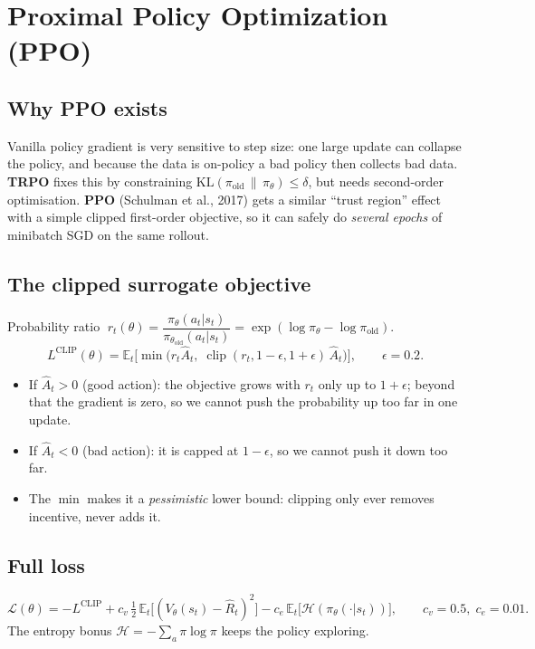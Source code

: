 \documentclass[11pt,a4paper]{article}
\newcommand{\E}{\mathbb{E}}
\begin{document}
\section{Proximal Policy Optimization (PPO)}

\subsection{Why PPO exists}
Vanilla policy gradient is very sensitive to step size: one large update can collapse the policy,
and because the data is on-policy a bad policy then collects bad data. \textbf{TRPO} fixes this by
constraining $\mathrm{KL}(\pi_{\text{old}}\,\|\,\pi_\theta)\le\delta$, but needs second-order
optimisation. \textbf{PPO} (Schulman et al., 2017) gets a similar ``trust region'' effect with a
simple clipped first-order objective, so it can safely do \emph{several epochs} of minibatch SGD on
the same rollout.

\subsection{The clipped surrogate objective}
Probability ratio $\;r_t(\theta)=\dfrac{\pi_\theta(a_t|s_t)}{\pi_{\theta_\text{old}}(a_t|s_t)}=\exp(\log\pi_\theta-\log\pi_{\text{old}})$.
\[
L^{\text{CLIP}}(\theta)=\E_t\Big[\min\big(r_t\hat A_t,\;\operatorname{clip}(r_t,1-\epsilon,1+\epsilon)\,\hat A_t\big)\Big],\qquad \epsilon=0.2.
\]
\begin{itemize}
  \item If $\hat A_t>0$ (good action): the objective grows with $r_t$ only up to $1+\epsilon$; beyond that
        the gradient is zero, so we cannot push the probability up too far in one update.
  \item If $\hat A_t<0$ (bad action): it is capped at $1-\epsilon$, so we cannot push it down too far.
  \item The $\min$ makes it a \emph{pessimistic} lower bound: clipping only ever removes incentive,
        never adds it.
\end{itemize}

\subsection{Full loss}
\[
\mathcal{L}(\theta)=-L^{\text{CLIP}}
+c_v\,\tfrac12\,\E_t\big[(V_\theta(s_t)-\hat R_t)^2\big]
-c_e\,\E_t\big[\mathcal{H}(\pi_\theta(\cdot|s_t))\big],
\qquad c_v=0.5,\;c_e=0.01.
\]
The entropy bonus $\mathcal{H}=-\sum_a\pi\log\pi$ keeps the policy exploring.
\end{document}
